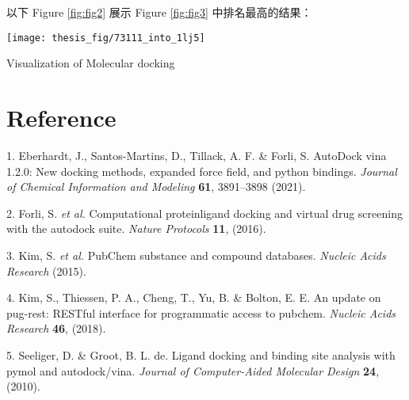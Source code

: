 \documentclass[
]{article}
\newenvironment{cslreferences}%
  {}%
  {\par}
\begin{document}
以下 Figure \ref{fig:fig2} 展示 Figure \ref{fig:fig3} 中排名最高的结果：

\def\@captype{figure}
\texttt{[image: thesis\_fig/73111\_into\_1lj5]} \caption{Visualization of Molecular docking}\label{fig:fig3}
\makeatletter

\hypertarget{bibliography}{%
\section*{Reference}\label{bibliography}}

\hypertarget{refs}{}
\begin{cslreferences}
\leavevmode\hypertarget{ref-AutodockVina1Eberha2021}{}%
1. Eberhardt, J., Santos-Martins, D., Tillack, A. F. \& Forli, S. AutoDock vina 1.2.0: New docking methods, expanded force field, and python bindings. \emph{Journal of Chemical Information and Modeling} \textbf{61}, 3891--3898 (2021).

\leavevmode\hypertarget{ref-ComputationalPForli2016}{}%
2. Forli, S. \emph{et al.} Computational proteinligand docking and virtual drug screening with the autodock suite. \emph{Nature Protocols} \textbf{11}, (2016).

\leavevmode\hypertarget{ref-PubchemSubstanKimS2015}{}%
3. Kim, S. \emph{et al.} PubChem substance and compound databases. \emph{Nucleic Acids Research} (2015).

\leavevmode\hypertarget{ref-AnUpdateOnPuKimS2018}{}%
4. Kim, S., Thiessen, P. A., Cheng, T., Yu, B. \& Bolton, E. E. An update on pug-rest: RESTful interface for programmatic access to pubchem. \emph{Nucleic Acids Research} \textbf{46}, (2018).

\leavevmode\hypertarget{ref-LigandDockingSeelig2010}{}%
5. Seeliger, D. \& Groot, B. L. de. Ligand docking and binding site analysis with pymol and autodock/vina. \emph{Journal of Computer-Aided Molecular Design} \textbf{24}, (2010).
\end{cslreferences}
\end{document}
